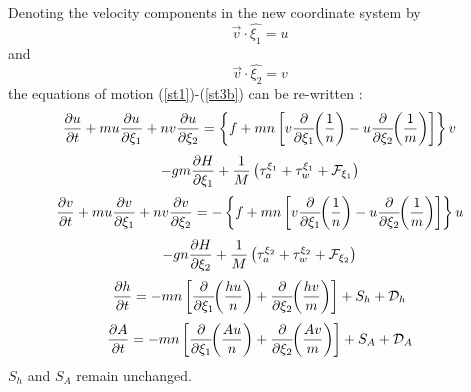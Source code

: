 Denoting the velocity components in the new coordinate system by
\begin{equation}
   \vec{v} \cdot \hat{\xi_1} = u
\end{equation}
and
\begin{equation}
   \vec{v} \cdot \hat{\xi_2} = v
\end{equation}
the equations of motion (\ref{st1})-(\ref{st3b}) can be re-written
\citep[see, e.g.,][]{AL}:
{\samepage
\[
   {\partial u \over \partial t} +
   m u {\partial u \over \partial \xi_1} +
   n v {\partial u \over \partial \xi_2} =
   \left\{f + mn \left[ v \frac{\partial}{\partial \xi_1}
   \!\! \left( \frac{1}{n} \right) - u \frac{\partial}{\partial \xi_2}
   \!\! \left( \frac{1}{m} \right) \right] \right\} v
\]
\begin{equation}
   - gm {\partial H \over \partial \xi_1} +
   {1 \over M} \left( \tau_a^{\xi_1} + \tau_w^{\xi_1} + {\cal F}_{\xi_1}
   \right)
\label{st13}
\end{equation}
}
\vspace{.2cm}
{\samepage
\[
   {\partial v \over \partial t} +
   m u {\partial v \over \partial \xi_1} +
   n v {\partial v \over \partial \xi_2} =
   - \left\{f + mn \left[ v \frac{\partial}{\partial \xi_1}
   \!\! \left( \frac{1}{n} \right) - u \frac{\partial}{\partial \xi_2}
   \!\! \left( \frac{1}{m} \right) \right] \right\} u
\]
\begin{equation}
   - gn {\partial H \over \partial \xi_2} +
   {1 \over M} \left( \tau_a^{\xi_2} + \tau_w^{\xi_2} + {\cal F}_{\xi_2}
   \right)
\label{st14}
\end{equation}
}
\vspace{.2cm}
\begin{equation}
   {\partial h \over \partial t} =
   - mn \left[ {\partial \over \partial \xi_1} \!\! \left( {hu \over n}
   \right ) + {\partial \over \partial \xi_2} \!\! \left( {hv \over m}
   \right) \right] + S_h + {\cal D}_h
\label{st15}
\end{equation}
\vspace{.2cm}
\begin{equation}
   {\partial A \over \partial t} =
   - mn \left[ {\partial \over \partial \xi_1} \!\! \left( {Au \over n}
   \right ) + {\partial \over \partial \xi_2} \!\! \left( {Av \over m}
   \right) \right] + S_A + {\cal D}_A
\label{st16}
\end{equation}
\vspace{.2cm}
$S_h$ and $S_A$ remain unchanged.

